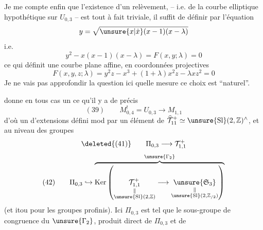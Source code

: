 Je me  compte enfin que l'existence d'un  relèvement, -- i.e. de la courbe elliptique hypothétique sur $U_{0,3}$ -- est tout à fait triviale, il suffit de  définir par l'équation
\[
y=\sqrt{\unsure{x|\dot x}(x-1)(x-\lambda)}
\]
i.e.
\[
y^2-x(x-1)(x-\lambda)=F(x,y;\lambda)=0
\]
ce qui définit une courbe plane affine,
 en coordonnées projectives
\[
F(x,y,z;\lambda)=y^2z-x^3+(1+\lambda)x^2z-\lambda xz^2=0
\]
 Je ne vais pas approfondir la question ici  quelle mesure ce choix est ``naturel''.

  donne en tous cas un   ce qu'il y a de précis
\[
(39)\qquad M_{0,4}^{!}=U_{0,3}\longrightarrow M_{1,1}
\]
d'où un  d'extensions
défini mod   par  un élément de $\widehat{\mathcal T}_{11}^{+}\simeq\unsure{\mathrm{Sl}}(2,\mathbb Z)^{\wedge}$, et au niveau des groupes 
\[
\deleted{(41)}\qquad \Pi_{0,3}\longrightarrow\mathcal T_{1,1}^{+}
\]
\[
(42)\qquad \Pi_{0,3}\hookrightarrow
\overbrace{\operatorname{Ker}\left(
\underset{\substack{\Vert\\\unsure{\mathrm{Sl}}(2,\mathbb Z)}}{\mathcal T_{1,1}^{+}}
\longrightarrow
\underset{\substack{\Vert\\\unsure{\mathrm{Sl}}(2,\mathbb Z_{/2})}}{\unsure{\mathfrak S_3}}
\right)}^{\unsure{\Gamma_2}}
\]
(et itou pour les groupes profinis). Ici $\Pi_{0,3}$ est tel que le sous-groupe de congruence du   \deleted{\unsure{$\Gamma$}}  $\unsure{\Gamma_2}$,  produit direct de   $\Pi_{0,3}$ et de
